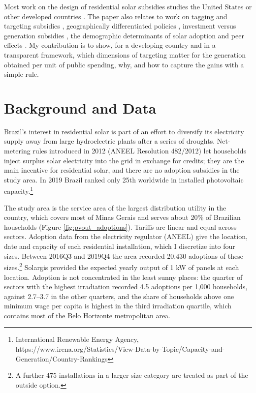 \documentclass[final,3p,times,authoryear]{elsarticle}
\begin{document}
    Most work on the design of residential solar subsidies studies the United States \citep{hughes2015getting, dgv2019pv_discountfactor, snashallwoodhams, burr2020pv_subsidies} or other developed countries \citep{feger2020pv_welfare}. The paper also relates to work on tagging and targeting subsidies \citep{allcott2015tagging, snashallwoodhams}, geographically differentiated policies \citep{miller2019managed_competition}, investment versus generation subsidies \citep{burr2020pv_subsidies, dgv2019pv_discountfactor}, the demographic determinants of solar adoption \citep{kwan2012influence, assunccao2020developing, degroote2016heterogeneity} and peer effects \citep{bollinger2012peer, gillingham2017social}. My contribution is to show, for a developing country and in a transparent framework, which dimensions of targeting matter for the generation obtained per unit of public spending, why, and how to capture the gains with a simple rule.

\section{Background and Data}
\label{Data}

    Brazil's interest in residential solar is part of an effort to diversify its electricity supply away from large hydroelectric plants after a series of droughts. Net-metering rules introduced in 2012 (ANEEL Resolution 482/2012) let households inject surplus solar electricity into the grid in exchange for credits; they are the main incentive for residential solar, and there are no adoption subsidies in the study area. In 2019 Brazil ranked only 25th worldwide in installed photovoltaic capacity.\footnote{International Renewable Energy Agency, https://www.irena.org/Statistics/View-Data-by-Topic/Capacity-and-Generation/Country-Rankings}

    The study area is the service area of the largest distribution utility in the country, which covers most of Minas Gerais and serves about 20\% of Brazilian households (Figure \ref{fig:pvout_adoptions}). Tariffs are linear and equal across sectors. Adoption data from the electricity regulator (ANEEL) give the location, date and capacity of each residential installation, which I discretize into four sizes. Between 2016Q3 and 2019Q4 the area recorded 20,430 adoptions of these sizes.\footnote{A further 475 installations in a larger size category are treated as part of the outside option.} Solargis provided the expected yearly output of 1 kW of panels at each location. Adoption is not concentrated in the least sunny places: the quarter of sectors with the highest irradiation recorded 4.5 adoptions per 1,000 households, against 2.7--3.7 in the other quarters, and the share of households above one minimum wage per capita is highest in the third irradiation quartile, which contains most of the Belo Horizonte metropolitan area.
\end{document}
